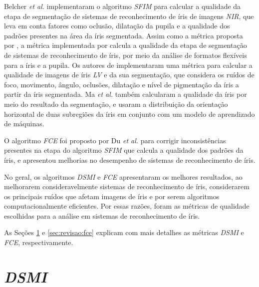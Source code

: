 \par Belcher \textit{et al.} \cite{belcher2008} implementaram o algoritmo \textit{\acrfull{SFIM}} para calcular a qualidade da etapa de segmentação de sistemas de reconhecimento de íris de imagens \textit{\acrshort{NIR}}, que leva em conta fatores como oclusão, dilatação da pupila e a qualidade dos padrões presentes na área da íris segmentada. Assim como a métrica proposta por \cite{belcher2008}, a métrica implementada por \cite{mottalli2009-DSMI-30} calcula a qualidade da etapa de segmentação de sistemas de reconhecimento de íris, por meio da análise de formatos flexíveis para a íris e a pupila. Os autores de \cite{proenca2011} implementaram uma métrica para calcular a qualidade de imagens de íris \textit{\acrshort{LV}} e da sua segmentação, que considera os ruídos de foco, movimento, ângulo, oclusões, dilatação e nível de pigmentação da íris a partir da íris segmentada. Ma \textit{et al.} \cite{ma2003-FIM-7} também calcularam a qualidade da íris por meio do resultado da segmentação, e usaram a distribuição da orientação horizontal de duas subregiões da íris em conjunto com um modelo de aprendizado de máquinas.

\par O algoritmo \textit{\acrshort{FCE}} foi proposto por Du \textit{et al.} \cite{du2010} para corrigir inconsistências presentes na etapa do algoritmo \textit{\acrshort{SFIM}} que calcula a qualidade dos padrões da íris, e apresentou melhorias no desempenho de sistemas de reconhecimento de íris.

\par No geral, os algoritmos \textit{\acrshort{DSMI}} e \textit{\acrshort{FCE}} apresentaram os melhores resultados, ao melhorarem consideravelmente sistemas de reconhecimento de íris, considerarem os principais ruídos que afetam imagens de íris e por serem algoritmos computacionalmente eficientes. Por essas razões, foram as métricas de qualidade escolhidas para a análise em sistemas de reconhecimento de íris.

\par As Seções \ref{sec:revisao:dsmi} e \ref{sec:revisao:fce} explicam com mais detalhes as métricas \textit{\acrshort{DSMI}} e \textit{\acrshort{FCE}}, respectivamente.


\section{\textit{\acrfull{DSMI}}} \label{sec:revisao:dsmi}

